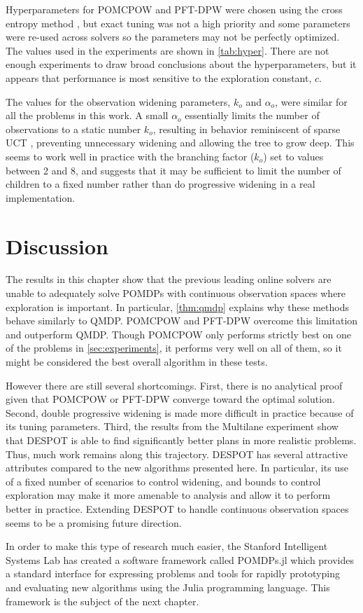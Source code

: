 Hyperparameters for POMCPOW and PFT-DPW were chosen using the cross entropy method \cite{mannor2003cross}, but exact tuning was not a high priority and some parameters were re-used across solvers so the parameters may not be perfectly optimized.
The values used in the experiments are shown in \cref{tab:hyper}. 
There are not enough experiments to draw broad conclusions about the hyperparameters, but it appears that performance is most sensitive to the exploration constant, $c$.

The values for the observation widening parameters, $k_o$ and $\alpha_o$, were similar for all the problems in this work.
A small $\alpha_o$ essentially limits the number of observations to a static number $k_o$, resulting in behavior reminiscent of sparse UCT \cite{browne2012survey}, preventing unnecessary widening and allowing the tree to grow deep.
This seems to work well in practice with the branching factor ($k_o$) set to values between \num{2} and \num{8}, and suggests that it may be sufficient to limit the number of children to a fixed number rather than do progressive widening in a real implementation.

\section{Discussion}

The results in this chapter show that the previous leading online solvers are unable to adequately solve POMDPs with continuous observation spaces where exploration is important.
In particular, \cref{thm:qmdp} explains why these methods behave similarly to QMDP.
POMCPOW and PFT-DPW overcome this limitation and outperform QMDP.
Though POMCPOW only performs strictly best on one of the problems in \cref{sec:experiments}, it performs very well on all of them, so it might be considered the best overall algorithm in these tests.

However there are still several shortcomings.
First, there is no analytical proof given that POMCPOW or PFT-DPW converge toward the optimal solution.
Second, double progressive widening is made more difficult in practice because of its tuning parameters.
Third, the results from the Multilane experiment show that DESPOT is able to find significantly better plans in more realistic problems.
Thus, much work remains along this trajectory.
DESPOT has several attractive attributes compared to the new algorithms presented here.
In particular, its use of a fixed number of scenarios to control widening, and bounds to control exploration may make it more amenable to analysis and allow it to perform better in practice.
Extending DESPOT to handle continuous observation spaces seems to be a promising future direction.

In order to make this type of research much easier, the Stanford Intelligent Systems Lab has created a software framework called POMDPs.jl which provides a standard interface for expressing problems and tools for rapidly prototyping and evaluating new algorithms using the Julia programming language.
This framework is the subject of the next chapter.
